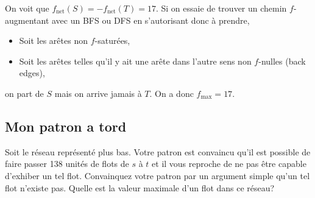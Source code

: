 \begin{solution}
  On voit que $f_\mathrm{net}(S) = -f_\mathrm{net}(T) = 17$.
  Si on essaie de trouver un chemin $f$-augmentant avec un BFS ou DFS
  en s'autorisant donc à prendre,
  \begin{itemize}
    \item Soit les arêtes non $f$-saturées,
    \item Soit les arêtes telles qu'il y ait une arête dans l'autre
      sens non $f$-nulles (back edges),
  \end{itemize}
  on part de $S$ mais on arrive jamais à $T$.
  On a donc $f_\mathrm{max} = 17$.
  \begin{center}
  \end{center}
\end{solution}


\subsection{Mon patron a tord}
Soit le réseau représenté plus bas. Votre patron est convaincu qu'il est possible de faire passer 138 unités de flots de $s$ à $t$ et il vous reproche de ne pas être capable d'exhiber un tel flot. Convainquez votre patron par un argument simple qu'un tel flot n'existe pas. Quelle est la valeur maximale d'un flot dans ce réseau?

